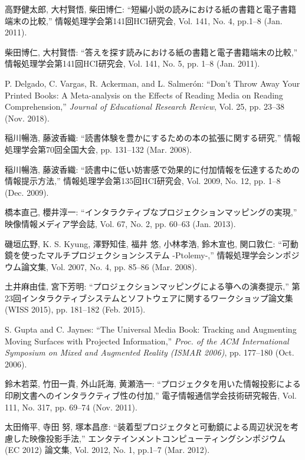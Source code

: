 \begin{thebibliography}{99}
	
	 高野健太郎, 大村賢悟, 柴田博仁: ``短編小説の読みにおける紙の書籍と電子書籍端末の比較,'' 情報処理学会第141回HCI研究会, Vol. 141, No. 4, pp.1--8 (Jan. 2011).
	
	柴田博仁, 大村賢悟: ``答えを探す読みにおける紙の書籍と電子書籍端末の比較,'' 情報処理学会第141回HCI研究会, Vol. 141, No. 5, pp. 1--8 (Jan. 2011).
	
	 P. Delgado, C. Vargas, R. Ackerman, and L. Salmer\'on: ``Don't Throw Away Your Printed Books: A Meta-analysis on the Effects of Reading Media on Reading Comprehension,'' {\it Journal of Educational Research Review}, Vol. 25, pp. 23--38 (Nov. 2018).
	 
	稲川暢浩, 藤波香織: ``読書体験を豊かにするための本の拡張に関する研究,'' 情報処理学会第70回全国大会, pp. 131--132 (Mar. 2008).
	 
	稲川暢浩, 藤波香織: ``読書中に低い妨害感で効果的に付加情報を伝達するための情報提示方法,'' 情報処理学会第135回HCI研究会, Vol. 2009, No. 12, pp. 1--8 (Dec. 2009).
	 
	 橋本直己, 櫻井淳一: ``インタラクティブなプロジェクションマッピングの実現,'' 映像情報メディア学会誌, Vol. 67, No. 2, pp. 60--63 (Jan. 2013).
	
	磯垣広野, K. S. Kyung, 澤野知佳, 福井 悠, 小林孝浩, 鈴木宣也, 関口敦仁: ``可動鏡を使ったマルチプロジェクションシステム -Ptolemy-,'' 情報処理学会シンポジウム論文集, Vol. 2007, No. 4, pp. 85--86 (Mar. 2008).
	
	土井麻由佳, 宮下芳明: ``プロジェクションマッピングによる箏への演奏提示,'' 第23回インタラクティブシステムとソフトウェアに関するワークショップ論文集(WISS 2015), pp. 181--182 (Feb. 2015).
	
	
	S. Gupta and C. Jaynes: ``The Universal Media Book: Tracking and Augmenting Moving Surfaces with Projected Information,'' {\it Proc. of the ACM International Symposium on Mixed and Augmented Reality (ISMAR 2006)}, pp. 177--180 (Oct. 2006).
	
	鈴木若菜, 竹田一貴, 外山託海, 黄瀬浩一: ``プロジェクタを用いた情報投影による印刷文書へのインタラクティブ性の付加,'' 電子情報通信学会技術研究報告, Vol. 111, No. 317, pp. 69--74 (Nov. 2011).
	
	太田脩平, 寺田 努, 塚本昌彦: ``装着型プロジェクタと可動鏡による周辺状況を考慮した映像投影手法,'' エンタテインメントコンピューティングシンポジウム (EC 2012) 論文集, Vol. 2012, No. 1,  pp.1--7 (Mar. 2012).
	

\end{thebibliography}
